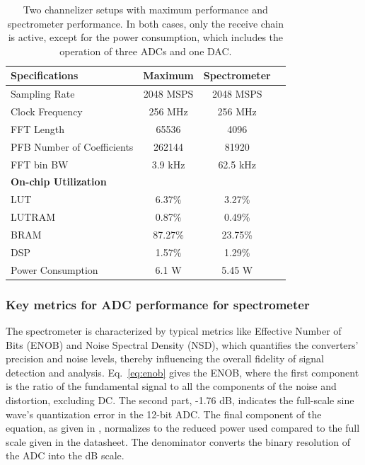\documentclass[fleqn,usenatbib]{rasti}
\begin{document}
\begin{table}
    \centering
    \caption{Two channelizer setups with maximum performance and spectrometer performance. In both cases, only the receive chain is active, except for the power consumption, which includes the operation of three ADCs and one DAC.}
    \label{tab:PowerConsumption}
    \begin{tabular}{lccr} %
        \hline
        \textbf{Specifications} & \textbf{Maximum} & \textbf{Spectrometer} \\
        \hline
        Sampling Rate & 2048 MSPS & 2048 MSPS\\
        Clock Frequency & 256 MHz & 256 MHz\\
        FFT Length & 65536 & 4096\\
        PFB Number of Coefficients & 262144 & 81920\\
        FFT bin BW & 3.9 kHz & 62.5 kHz\\
        \hline
        \multicolumn{1}{l}{\textbf{On-chip Utilization}} \\
        \hline
        LUT & 6.37\% & 3.27\%\\
        LUTRAM & 0.87\% & 0.49\%\\
        BRAM & 87.27\% & 23.75\%\\
        DSP & 1.57\% & 1.29\%\\
        Power Consumption & 6.1 W & 5.45 W\\
        \hline
    \end{tabular}
\end{table}

\subsubsection{Key metrics for ADC performance for spectrometer}

The spectrometer is characterized by typical metrics like Effective Number of Bits (ENOB) and Noise Spectral Density (NSD), which quantifies the converters' precision and noise levels, thereby influencing the overall fidelity of signal detection and analysis. Eq.~\ref{eq:enob} gives the ENOB, where the first component is the ratio of the fundamental signal to all the components of the noise and distortion, excluding DC. The second part, -1.76 dB, indicates the full-scale sine wave's quantization error in the 12-bit ADC. The final component of the equation, as given in \cite{AnalogMT003}, normalizes to the reduced power used compared to the full scale given in the datasheet. The denominator converts the binary resolution of the ADC into the dB scale.
\end{document}
